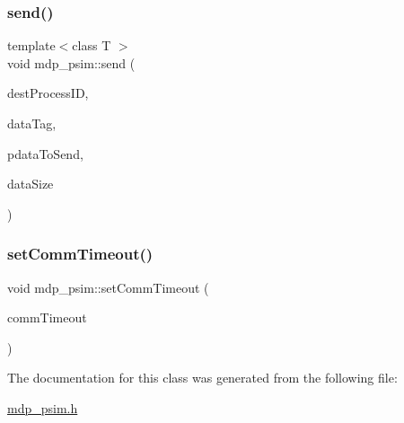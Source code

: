 \subsubsection{\texorpdfstring{send()}{send()}\hspace{0.1cm}{\footnotesize\ttfamily [2/2]}}
{\footnotesize\ttfamily template$<$class T $>$ \\
void mdp\+\_\+psim\+::send (\begin{DoxyParamCaption}\item[{int}]{dest\+Process\+ID,  }\item[{string}]{data\+Tag,  }\item[{T $\ast$}]{pdata\+To\+Send,  }\item[{\hyperlink{mdp__global__vars_8h_aaa1ad9d0dcd2124aa5af0120d9954174}{mdp\+\_\+int}}]{data\+Size }\end{DoxyParamCaption})\hspace{0.3cm}{\ttfamily [inline]}}

\mbox{\label{classmdp__psim_a1bbcfd250b4df9520ae4ff07fefe9204}} 
\subsubsection{\texorpdfstring{set\+Comm\+Timeout()}{setCommTimeout()}}
{\footnotesize\ttfamily void mdp\+\_\+psim\+::set\+Comm\+Timeout (\begin{DoxyParamCaption}\item[{unsigned int}]{comm\+Timeout }\end{DoxyParamCaption})\hspace{0.3cm}{\ttfamily [inline]}}



The documentation for this class was generated from the following file\+:\begin{DoxyCompactItemize}
\item 
\hyperlink{mdp__psim_8h}{mdp\+\_\+psim.\+h}\end{DoxyCompactItemize}

